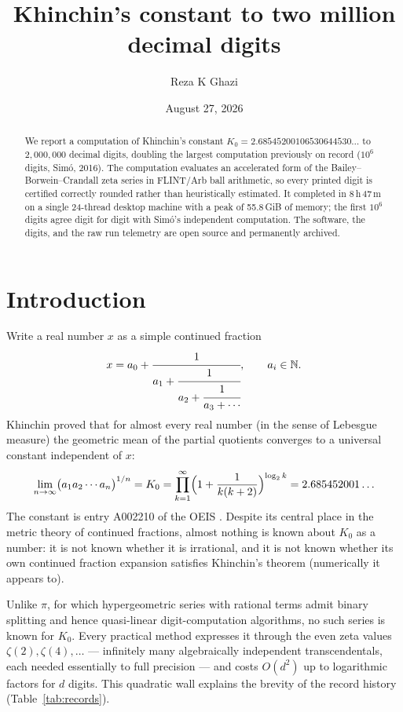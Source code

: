 \documentclass[11pt]{amsart}
\title{Khinchin's constant to two million decimal digits}
\author{Reza K Ghazi}
\date{August 27, 2026}
\newcommand{\Kzero}{K_0}
\begin{document}
\begin{abstract}
We report a computation of Khinchin's constant
$\Kzero = 2.68545200106530644530\ldots$ to $2{,}000{,}000$ decimal
digits, doubling the largest computation previously on record
($10^6$ digits, Sim\'o, 2016). The computation evaluates an
accelerated form of the Bailey--Borwein--Crandall zeta series in
FLINT/Arb ball arithmetic, so every printed digit is certified
correctly rounded rather than heuristically estimated. It completed in
8\,h\,47\,m on a single 24-thread desktop machine with a peak of
55.8\,GiB of memory; the first $10^6$ digits agree digit for digit
with Sim\'o's independent computation. The software, the digits, and
the raw run telemetry are open source and permanently archived.
\end{abstract}

\maketitle

\section{Introduction}

Write a real number $x$ as a simple continued fraction
\[
x = a_0 + \cfrac{1}{a_1 + \cfrac{1}{a_2 + \cfrac{1}{a_3 + \dotsb}}},
\qquad a_i \in \mathbb{N}.
\]
Khinchin \cite{khinchin1935} proved that for almost every real number
(in the sense of Lebesgue measure) the geometric mean of the partial
quotients converges to a universal constant independent of $x$:
\[
\lim_{n\to\infty} \bigl(a_1 a_2 \cdots a_n\bigr)^{1/n}
= \Kzero
= \prod_{k=1}^{\infty} \Bigl(1 + \frac{1}{k(k+2)}\Bigr)^{\log_2 k}
= 2.685452001\ldots
\]
The constant is entry A002210 of the OEIS \cite{oeis}. Despite its
central place in the metric theory of continued fractions, almost
nothing is known about $\Kzero$ as a number: it is not known whether it
is irrational, and it is not known whether its own continued fraction
expansion satisfies Khinchin's theorem (numerically it appears to).

Unlike $\pi$, for which hypergeometric series with rational terms admit
binary splitting and hence quasi-linear digit-computation algorithms,
no such series is known for $\Kzero$. Every practical method expresses
it through the even zeta values $\zeta(2), \zeta(4), \ldots$ ---
infinitely many algebraically independent transcendentals, each needed
essentially to full precision --- and costs $O(d^2)$ up to logarithmic
factors for $d$ digits. This quadratic wall explains the brevity of the
record history (Table~\ref{tab:records}).
\end{document}
